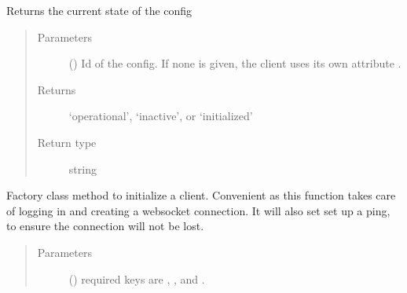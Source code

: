 \documentclass[letterpaper,10pt,english,openany,oneside]{sphinxmanual}
\begin{document}
\begin{fulllineitems}
\begin{fulllineitems}
\label{\detokenize{_modules/AconitySTUDIO_client:AconitySTUDIO_client.AconitySTUDIO_client.config_state}}
Returns the current state of the config
\begin{quote}\begin{description}
\item[{Parameters}] \leavevmode
{} () \textendash{} Id of the config. If none is given, the client uses its own attribute .

\item[{Returns}] \leavevmode
‘operational’, ‘inactive’, or ‘initialized’

\item[{Return type}] \leavevmode
string

\end{description}\end{quote}

\end{fulllineitems}


\begin{fulllineitems}
\label{\detokenize{_modules/AconitySTUDIO_client:AconitySTUDIO_client.AconitySTUDIO_client.create}}
Factory class method to initialize a client.
Convenient as this function takes care of logging in and creating a websocket connection.
It will also set set up a ping, to ensure the connection will not be lost.
\begin{quote}\begin{description}
\item[{Parameters}] \leavevmode
{} () \textendash{} required keys are , ,  and .

\end{description}\end{quote}


\end{fulllineitems}
\end{fulllineitems}
\end{document}
